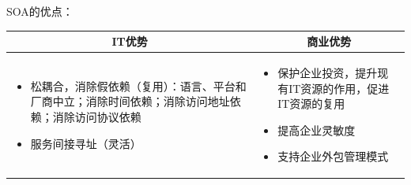 \begin{solution}
SOA的优点：
\begin{spacing}{1.2}
    \vspace{-0.5em}
    \begin{longtable}{|m{7.5cm}|m{7.5cm}|}
        \hline
        \multicolumn{1}{|c|}{\textbf{IT优势}} & \multicolumn{1}{c|}{\textbf{商业优势}} \\ \hline
        \vspace{-1.3em}
        \begin{itemize}[leftmargin=1.5em,itemsep=-3pt]
            \item 松耦合，消除假依赖（复用）：语言、平台和厂商中立；消除时间依赖；消除访问地址依赖；消除访问协议依赖
            \item 服务间接寻址（灵活）
        \vspace{-1.5em}
        \end{itemize}                                           
            & 
        \vspace{-1.3em}
        \begin{itemize}[leftmargin=1.5em,itemsep=-3pt]
            \item 保护企业投资，提升现有IT资源的作用，促进IT资源的复用
            \item 提高企业灵敏度
            \item 支持企业外包管理模式
        \vspace{-1.5em}
        \end{itemize}  
        \\ \hline
    \end{longtable}
    \vspace{-1em}
\end{spacing}

\end{solution}